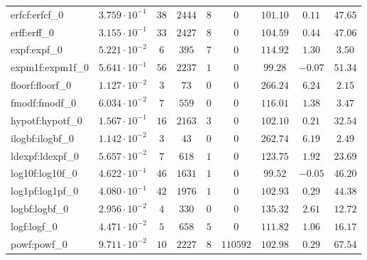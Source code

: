 \begin{tabular}{|l|c|c|c|c|c|c|c|c|}
erfcf:erfcf\_0               & $ 3.759 \cdot 10^{-1} $ & $ 38     $ & $ 2444  $ & $ 8   $ & $ 0      $ & $ 101.10      $ & $ 0.11    $ & $ 47.65   $ \\
erff:erff\_0                 & $ 3.155 \cdot 10^{-1} $ & $ 33     $ & $ 2427  $ & $ 8   $ & $ 0      $ & $ 104.59      $ & $ 0.44    $ & $ 47.06   $ \\
expf:expf\_0                 & $ 5.221 \cdot 10^{-2} $ & $ 6      $ & $ 395   $ & $ 7   $ & $ 0      $ & $ 114.92      $ & $ 1.30    $ & $ 3.50    $ \\
expm1f:expm1f\_0             & $ 5.641 \cdot 10^{-1} $ & $ 56     $ & $ 2237  $ & $ 1   $ & $ 0      $ & $ 99.28       $ & $ -0.07   $ & $ 51.34   $ \\
floorf:floorf\_0             & $ 1.127 \cdot 10^{-2} $ & $ 3      $ & $ 73    $ & $ 0   $ & $ 0      $ & $ 266.24      $ & $ 6.24    $ & $ 2.15    $ \\
fmodf:fmodf\_0               & $ 6.034 \cdot 10^{-2} $ & $ 7      $ & $ 559   $ & $ 0   $ & $ 0      $ & $ 116.01      $ & $ 1.38    $ & $ 3.47    $ \\
hypotf:hypotf\_0             & $ 1.567 \cdot 10^{-1} $ & $ 16     $ & $ 2163  $ & $ 3   $ & $ 0      $ & $ 102.10      $ & $ 0.21    $ & $ 32.54   $ \\
ilogbf:ilogbf\_0             & $ 1.142 \cdot 10^{-2} $ & $ 3      $ & $ 43    $ & $ 0   $ & $ 0      $ & $ 262.74      $ & $ 6.19    $ & $ 2.49    $ \\
ldexpf:ldexpf\_0             & $ 5.657 \cdot 10^{-2} $ & $ 7      $ & $ 618   $ & $ 1   $ & $ 0      $ & $ 123.75      $ & $ 1.92    $ & $ 23.69   $ \\
log10f:log10f\_0             & $ 4.622 \cdot 10^{-1} $ & $ 46     $ & $ 1631  $ & $ 1   $ & $ 0      $ & $ 99.52       $ & $ -0.05   $ & $ 46.20   $ \\
log1pf:log1pf\_0             & $ 4.080 \cdot 10^{-1} $ & $ 42     $ & $ 1976  $ & $ 1   $ & $ 0      $ & $ 102.93      $ & $ 0.29    $ & $ 44.38   $ \\
logbf:logbf\_0               & $ 2.956 \cdot 10^{-2} $ & $ 4      $ & $ 330   $ & $ 0   $ & $ 0      $ & $ 135.32      $ & $ 2.61    $ & $ 12.72   $ \\
logf:logf\_0                 & $ 4.471 \cdot 10^{-2} $ & $ 5      $ & $ 658   $ & $ 5   $ & $ 0      $ & $ 111.82      $ & $ 1.06    $ & $ 16.17   $ \\
powf:powf\_0                 & $ 9.711 \cdot 10^{-2} $ & $ 10     $ & $ 2227  $ & $ 8   $ & $ 110592 $ & $ 102.98      $ & $ 0.29    $ & $ 67.54   $ \\

\end{tabular}
